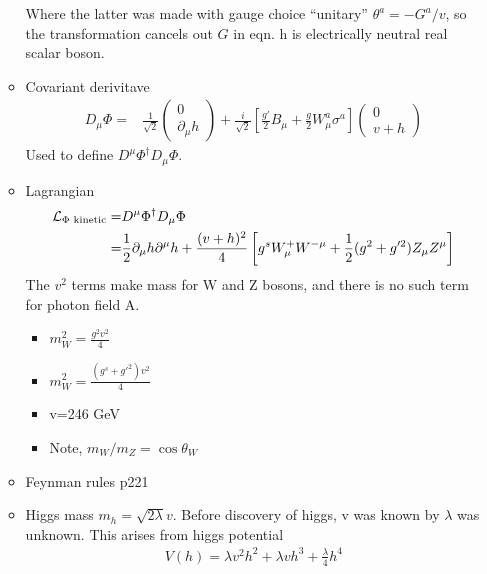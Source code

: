 \begin{itemize}
\begin{itemize}
        Where the latter was made with gauge choice ``unitary'' $\theta^a=-G^a/v$, so the transformation cancels out $G$ in eqn. h is electrically neutral real scalar boson.
        \item Covariant derivitave \cite{wells}
        \begin{equation}\begin{split}
        D_\mu\Phi=&\frac{1}{\sqrt{2}}\begin{pmatrix}0\\\partial_\mu h\end{pmatrix}+\frac{i}{\sqrt{2}}\left[\frac{g'}{2}B_\mu+\frac{g}{2}W_\mu^a\sigma^a\right] \begin{pmatrix}0\\v+h\end{pmatrix}
        \end{split}\end{equation}
        Used to define $D^\mu\Phi^\dagger D_\mu\Phi$.
        \item Lagrangian \cite{wells}
        \begin{equation}\begin{split}
        \mathcal{L}_{\Phi\text{ kinetic}}=&D^\mu\Phi^\dagger D_\mu\Phi \\
        =&\frac{1}{2}\partial_\mu h\partial^\mu h+\frac{(v+h)^2}{4}\left[g^sW^+_\mu W^{-\mu}+\frac{1}{2}(g^2+g'^2)Z_\mu Z^\mu\right] \\
        \end{split}\end{equation}
        The $v^2$ terms make mass for W and Z bosons, and there is no such term for photon field A.
        \begin{itemize}
            \item $m_W^2=\frac{g^2v^2}{4}$ \cite{wells}
            \item $m_W^2=\frac{(g^s+g'^2)v^2}{4}$ \cite{wells}
            \item v=246 GeV \cite{wells}
            \item Note, $m_W/m_Z=\cos\theta_W$ \cite{wells}
        \end{itemize}
        \item {\color{red} Feynman rules p221} \cite{wells}
        \item Higgs mass $m_h=\sqrt{2\lambda}v$. Before discovery of higgs, v was known by $\lambda$ was unknown. This arises from higgs potential \cite{wells}
        \begin{equation}\begin{split}
        V(h)=\lambda v^2h^2+\lambda vh^3+\frac{\lambda}{4}h^4 \\

\end{split}
\end{equation}
\end{itemize}
\end{itemize}
